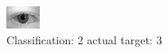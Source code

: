 \begin{figure}[h!]
\begin{center}
\includegraphics[width=0.60\columnwidth]{figures/ID608_class_2_target_3.png}
\end{center}
\caption{ Classification: 2 actual target: 3}
\label{fig:ID608_class_2_target_3}
\end{figure}
